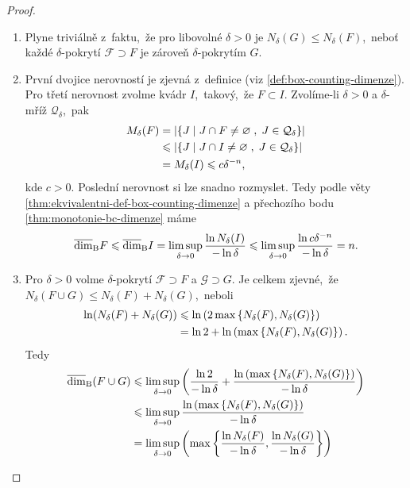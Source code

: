 \begin{proof}
    \begin{enumerate}[label=\textit{(\roman*)}]
        \item Plyne triviálně z~faktu,~že pro libovolné $\delta>0$ je $N_\delta(G)\leqslant N_\delta(F)$,~neboť každé $\delta$-pokrytí $\mathcal{F}\supset F$ je zároveň $\delta$-pokrytím $G$.
        \item První dvojice nerovností je zjevná z~definice (viz \ref{def:box-counting-dimenze}). Pro třetí nerovnost zvolme kvádr $I$,~takový,~že $F\subset I$. Zvolíme-li $\delta>0$ a $\delta$-mříž $\mathcal{Q}_\delta$,~pak
        \begin{align*}
            M_\delta(F)&=\left|\left\{J\;\middle|\;J\cap F\neq\varnothing\;,\;J\in\mathcal{Q}_\delta\right\}\right|\\
            &\leqslant \left|\left\{J\;\middle|\;J\cap I\neq\varnothing\;,\;J\in\mathcal{Q}_\delta\right\}\right|\\
            &=M_\delta(I)\leqslant c\delta^{-n},
        \end{align*}
        kde $c>0$. Poslední nerovnost si lze snadno rozmyslet. Tedy podle věty \ref{thm:ekvivalentni-def-box-counting-dimenze} a přechozího bodu \ref{thm:monotonie-bc-dimenze} máme
        \[\overline{\dim}_\textup{B}{F}\leqslant\overline{\dim}_\textup{B}{I}=\limsup_{\delta\to 0}\dfrac{\ln{N_\delta(I)}}{-\ln{\delta}}\leqslant\limsup_{\delta\to 0}\dfrac{\ln{c\delta^{-n}}}{-\ln{\delta}}=n.\]
        \item Pro $\delta>0$ volme $\delta$-pokrytí $\mathcal{F}\supset F$ a $\mathcal{G}\supset G$. Je celkem zjevné,~že $N_\delta(F\cup G)\leqslant N_\delta(F)+N_\delta(G)$,~neboli
        \begin{align*}
            \ln(N_\delta(F)+N_\delta(G))&\leqslant \ln\left(2\max\left\{N_\delta(F),N_\delta(G)\right\}\right)\\
            &=\ln{2}+\ln\left(\max\left\{N_\delta(F),N_\delta(G)\right\}\right).
        \end{align*}
        Tedy
        \begin{align*}
            \upperdimB(F\cup G)&\leqslant\limsup_{\delta\to 0}\left(\dfrac{\ln{2}}{-\ln{\delta}}+\dfrac{\ln\left(\max\set{N_\delta(F),N_\delta(G)}\right)}{-\ln{\delta}}\right)\\
            &\leqslant\limsup_{\delta\to 0}\dfrac{\ln\left(\max\set{N_\delta(F),N_\delta(G)}\right)}{-\ln{\delta}}\\
            &=\limsup_{\delta\to 0}\left(\max\set{\dfrac{\ln{N_\delta(F)}}{-\ln{\delta}},\dfrac{\ln{N_\delta(G)}}{-\ln{\delta}}}\right)\\

\end{align*}
\end{enumerate}
\end{proof}
